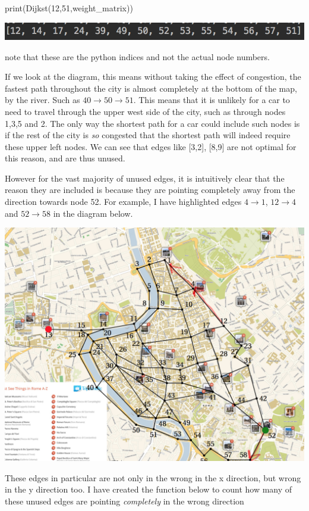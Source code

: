 \documentclass[paper=a4, fontsize=12pt]{scrartcl} %
\numberwithin{equation}{section}       %
\numberwithin{figure}{section}         %
\numberwithin{table}{section}          %
\begin{document}
\begin{python}
print(Dijkst(12,51,weight_matrix))
\end{python}

\includegraphics{normalpath}

note that these are the python indices and not the actual node numbers.

If we look at the diagram, this means without taking the effect of congestion, the fastest path throughout the city is almost completely at the bottom of the map, by the river. Such as $40 \to 50 \to 51$. This means that it is unlikely for a car to need to travel through the upper west side of the city, such as through nodes 1,3,5 and 2. The only way the shortest path for a car could include such nodes is if the rest of the city is \textit{so} congested that the shortest path will indeed require these upper left nodes. We can see that edges like [3,2], [8,9] are not optimal for this reason, and are thus unused.

However for the vast majority of unused edges, it is intuitively clear that the reason they are included is because they are pointing completely away from the direction towards node 52. For example, I have highlighted edges $4 \to 1$, $12 \to 4$ and $52 \to 58$ in the diagram below.

\includegraphics[scale=0.6]{drawngraph}
 
These edges in particular are not only in the wrong in the x direction, but wrong in the y direction too. I have created the function below to count how many of these unused edges are pointing \textit{completely} in the wrong direction
\end{document}

